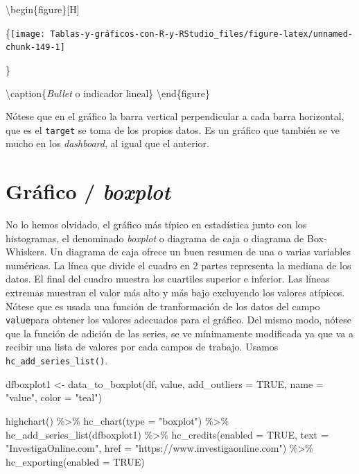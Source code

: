 \documentclass[
]{book}
\newenvironment{Shaded}{\begin{snugshade}}{\end{snugshade}}
\newcommand{\AttributeTok}[1]{\textcolor[rgb]{0.77,0.63,0.00}{#1}}
\newcommand{\ConstantTok}[1]{\textcolor[rgb]{0.00,0.00,0.00}{#1}}
\newcommand{\FunctionTok}[1]{\textcolor[rgb]{0.00,0.00,0.00}{#1}}
\newcommand{\NormalTok}[1]{#1}
\newcommand{\OtherTok}[1]{\textcolor[rgb]{0.56,0.35,0.01}{#1}}
\newcommand{\SpecialCharTok}[1]{\textcolor[rgb]{0.00,0.00,0.00}{#1}}
\newcommand{\StringTok}[1]{\textcolor[rgb]{0.31,0.60,0.02}{#1}}
\begin{document}
\textbackslash begin\{figure\}{[}H{]}

\{\centering \texttt{[image: Tablas-y-gráficos-con-R-y-RStudio\_files/figure-latex/unnamed-chunk-149-1]}

\}

\textbackslash caption\{\emph{Bullet} o indicador lineal\}\label{fig:unnamed-chunk-149}
\textbackslash end\{figure\}

Nótese que en el gráfico la barra vertical perpendicular a cada barra horizontal, que es el \texttt{target} se toma de los propios datos. Es un gráfico que también se ve mucho en los \emph{dashboard}, al igual que el anterior.

\hypertarget{gruxe1fico-boxplot}{%
\section{\texorpdfstring{Gráfico / \emph{boxplot}}{Gráfico / boxplot}}\label{gruxe1fico-boxplot}}

No lo hemos olvidado, el gráfico más típico en estadística junto con los histogramas, el denominado \emph{boxplot} o diagrama de caja o diagrama de Box-Whiskers. Un diagrama de caja ofrece un buen resumen de una o varias variables numéricas. La línea que divide el cuadro en 2 partes representa la mediana de los datos. El final del cuadro muestra los cuartiles superior e inferior. Las líneas extremas muestran el valor más alto y más bajo excluyendo los valores atípicos. Nótese que es usada una función de tranformación de los datos del campo \texttt{value}para obtener los valores adecuados para el gráfico. Del mismo modo, nótese que la función de adición de las series, se ve mínimamente modificada ya que va a recibir una lista de valores por cada campos de trabajo. Usamos \texttt{hc\_add\_series\_list()}.

\begin{Shaded}
\begin{Highlighting}[]
\NormalTok{dfboxplot1 }\OtherTok{\textless{}{-}} \FunctionTok{data\_to\_boxplot}\NormalTok{(df, value, }\AttributeTok{add\_outliers =} \ConstantTok{TRUE}\NormalTok{, }
  \AttributeTok{name =} \StringTok{"value"}\NormalTok{, }\AttributeTok{color =} \StringTok{"teal"}\NormalTok{)}

\FunctionTok{highchart}\NormalTok{() }\SpecialCharTok{\%\textgreater{}\%} \FunctionTok{hc\_chart}\NormalTok{(}\AttributeTok{type =} \StringTok{"boxplot"}\NormalTok{) }\SpecialCharTok{\%\textgreater{}\%} \FunctionTok{hc\_add\_series\_list}\NormalTok{(dfboxplot1) }\SpecialCharTok{\%\textgreater{}\%} 
  \FunctionTok{hc\_credits}\NormalTok{(}\AttributeTok{enabled =} \ConstantTok{TRUE}\NormalTok{, }\AttributeTok{text =} \StringTok{"InvestigaOnline.com"}\NormalTok{, }
    \AttributeTok{href =} \StringTok{"https://www.investigaonline.com"}\NormalTok{) }\SpecialCharTok{\%\textgreater{}\%} \FunctionTok{hc\_exporting}\NormalTok{(}\AttributeTok{enabled =} \ConstantTok{TRUE}\NormalTok{)}
\end{Highlighting}
\end{Shaded}
\end{document}
